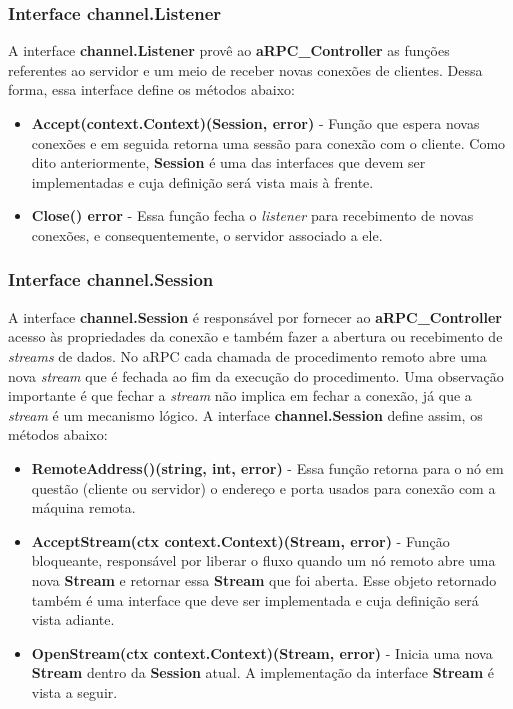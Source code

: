 \subsubsection{Interface channel.Listener}

A interface \textbf{channel.Listener} provê ao \textbf{aRPC\_Controller} as funções referentes ao servidor e um meio de receber novas conexões de clientes. Dessa forma, essa interface define os métodos abaixo:

\begin{itemize}
	\item \textbf{Accept(context.Context)(Session, error)} - Função que espera novas conexões e em seguida retorna uma sessão para conexão com o cliente. Como dito anteriormente, \textbf{Session} é uma das interfaces que devem ser implementadas e cuja definição será vista mais à frente.
	\item \textbf{Close() error} - Essa função fecha o \textit{listener} para recebimento de novas conexões, e consequentemente, o servidor associado a ele.
\end{itemize}

\subsubsection{Interface channel.Session}

A interface \textbf{channel.Session} é responsável por fornecer ao \textbf{aRPC\_Controller} acesso às propriedades da conexão e também fazer a abertura ou recebimento de \textit{streams} de dados. No aRPC cada chamada de procedimento remoto abre uma nova \textit{stream} que  é fechada ao fim da execução do procedimento. Uma observação importante é que fechar a \textit{stream} não implica em fechar a conexão, já que a \textit{stream} é um mecanismo lógico. A interface \textbf{channel.Session} define assim, os métodos abaixo:

\begin{itemize}
	\item \textbf{RemoteAddress()(string, int, error)} - Essa função retorna para o nó em questão (cliente ou servidor) o endereço e porta usados para conexão com a máquina remota.
	\item \textbf{AcceptStream(ctx context.Context)(Stream, error)} - Função bloqueante, responsável por liberar o fluxo quando um nó remoto abre uma nova \textbf{Stream} e retornar essa \textbf{Stream} que foi aberta. Esse objeto retornado também é uma interface que deve ser implementada e cuja definição será vista adiante.
	\item \textbf{OpenStream(ctx context.Context)(Stream, error)} - Inicia uma nova \textbf{Stream} dentro da \textbf{Session} atual. A implementação da interface \textbf{Stream} é vista a seguir.
\end{itemize}

